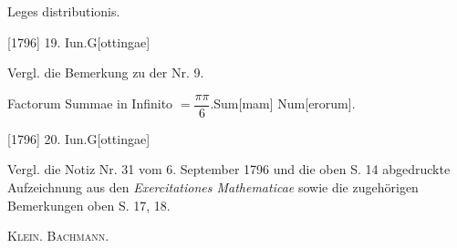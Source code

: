 \indent Leges distributionis.
\par\noindent\hfill[1796] 19. Iun.\quad G[ottingae]
\par\medskip\begingroup\small
\indent Vergl. die Bemerkung zu der Nr. 9.
\par\endgroup

\indent Factorum Summae in Infinito \(=\dfrac{\pi\pi}{6}.\)Sum[mam] Num[erorum].
\par\noindent\hfill[1796] 20. Iun.\quad G[ottingae]
\par\medskip\begingroup\small
\indent Vergl. die Notiz Nr. 31 vom 6. September 1796 und die oben S. 14 abgedruckte Aufzeichnung aus den \textit{Exercitationes Mathematicae} sowie die zugehörigen Bemerkungen oben S. 17, 18.
\par\noindent\hfill\textsc{Klein. Bachmann.}
\par\endgroup
